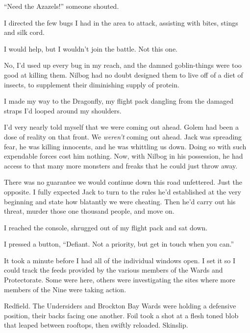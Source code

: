 ``Need the Azazels!'' someone shouted.



I directed the few bugs I had in the area to attack, assisting with bites, stings and silk cord.



I would help, but I wouldn't join the battle.  Not this one.



No, I'd used up every bug in my reach, and the damned goblin-things were too good at killing them.  Nilbog had no doubt designed them to live off of a diet of insects, to supplement their diminishing supply of protein.



I made my way to the Dragonfly, my flight pack dangling from the damaged straps I'd looped around my shoulders.



I'd very nearly told myself that we were coming out ahead.  Golem had been a dose of reality on that front.  We \emph{weren't }coming out ahead.  Jack was spreading fear, he was killing innocents, and he was whittling us down.  Doing so with such expendable forces cost him nothing.  Now, with Nilbog in his possession, he had access to that many more monsters and freaks that he could just throw away.



There was no guarantee we would continue down this road unfettered.  Just the opposite.  I fully expected Jack to turn to the rules he'd established at the very beginning and state how blatantly we were cheating.  Then he'd carry out his threat, murder those one thousand people, and move on.



I reached the console, shrugged out of my flight pack and sat down.



I pressed a button, ``Defiant.  Not a priority, but get in touch when you can.''



It took a minute before I had all of the individual windows open.  I set it so I could track the feeds provided by the various members of the Wards and Protectorate.  Some were here, others were investigating the sites where more members of the Nine were taking action.



Redfield.  The Undersiders and Brockton Bay Wards were holding a defensive position, their backs facing one another.  Foil took a shot at a flesh toned blob that leaped between rooftops, then swiftly reloaded.  Skinslip.



